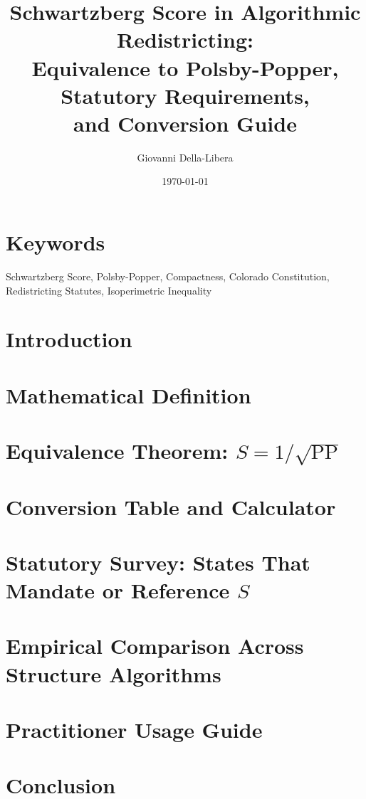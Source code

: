 \documentclass[12pt]{article}
\title{\textbf{Schwartzberg Score in Algorithmic Redistricting:\\
Equivalence to Polsby-Popper, Statutory Requirements,\\
and Conversion Guide}}
\author{Giovanni Della-Libera}
\date{\today}
\begin{document}
\maketitle

\begin{abstract}

\end{abstract}

\section*{Keywords}
Schwartzberg Score, Polsby-Popper, Compactness, Colorado Constitution,
Redistricting Statutes, Isoperimetric Inequality

\section{Introduction}


\section{Mathematical Definition}


\section{Equivalence Theorem: $S = 1/\sqrt{\text{PP}}$}


\section{Conversion Table and Calculator}


\section{Statutory Survey: States That Mandate or Reference $S$}


\section{Empirical Comparison Across Structure Algorithms}


\section{Practitioner Usage Guide}


\section{Conclusion}




\end{document}
